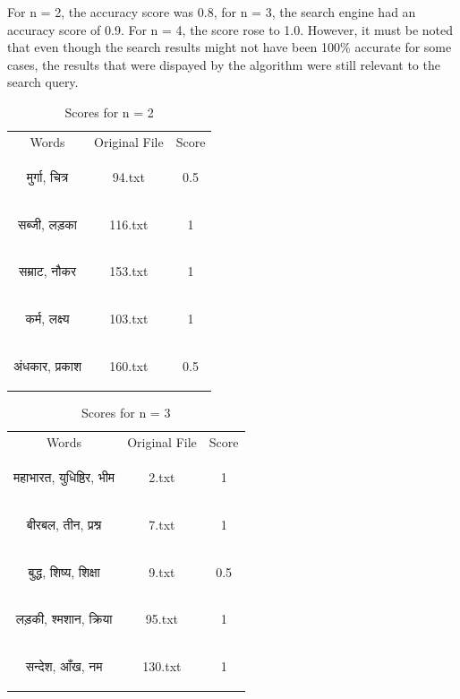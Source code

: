 \documentclass[12pt]{article}
\begin{document}
	For n = 2, the accuracy score was 0.8, for n = 3, the search engine had an accuracy score of 0.9. For n = 4, the score rose to 1.0. However, it must be noted that even though the search results might not have been 100\% accurate for some cases, the results that were dispayed by the algorithm were still relevant to the search query.\\
	\smallskip
	\smallskip
	\smallskip
	\smallskip
	\smallskip
	\begin{table}[H]
		\centering	
		\begin{tabular}{|c|c|c|}
			\hline
			Words & Original File & Score\\
			\begin{sanskrit}
				मुर्गा, चित्र
			\end{sanskrit} & 94.txt & 0.5\\
			\begin{sanskrit}
				सब्जी, लड़का
			\end{sanskrit} & 116.txt & 1\\
			\begin{sanskrit}
				सम्राट, नौकर
			\end{sanskrit} & 153.txt & 1\\
			\begin{sanskrit}
				कर्म, लक्ष्य
			\end{sanskrit} & 103.txt & 1\\
			\begin{sanskrit}
				अंधकार, प्रकाश
			\end{sanskrit} & 160.txt & 0.5\\
			\hline
		\end{tabular}
		\caption{Scores for n = 2}
	\end{table}
	\begin{table}
		\centering
		\begin{tabular}{|c|c|c|}
			\hline
			Words & Original File & Score\\
			\begin{sanskrit}
				महाभारत, युधिष्ठिर, भीम
			\end{sanskrit} & 2.txt & 1\\
			\begin{sanskrit}
				बीरबल, तीन, प्रश्न 
			\end{sanskrit}& 7.txt & 1\\
			\begin{sanskrit}
				बुद्ध, शिष्य, शिक्षा 
			\end{sanskrit}& 9.txt & 0.5 \\
			\begin{sanskrit}
				लड़की, श्मशान, क्रिया 
			\end{sanskrit}& 95.txt & 1\\
			\begin{sanskrit}
				सन्देश, आँख, नम 
			\end{sanskrit}& 130.txt & 1\\
			\hline
		\end{tabular}
		\caption{Scores for n = 3}
	\end{table}
\end{document}
